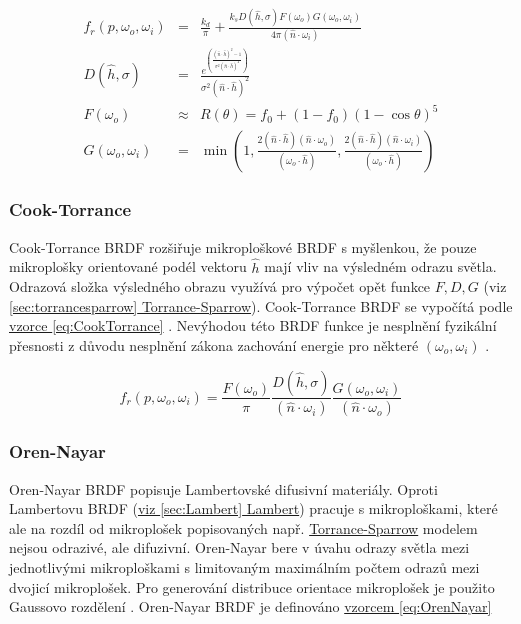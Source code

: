\documentclass[czech,master,dept460,male,cpp,cpdeclaration]{diploma}
\newcommand{\uvec}[1]{\hat{#1}}
\newcommand{\point}{p}
\newcommand{\brdf}{f_r\left(\point,\omega_{o},\omega_{i}\right)}
\newcommand{\normVec}{\uvec{n}}
\newcommand{\inVec}{\omega_{i}}
\newcommand{\outVec}{\omega_{o}}
\newcommand{\halfVec}{\uvec{h}}
\newcommand{\rough}{\sigma}
\newcommand{\ior}{f_0}
\begin{document}
\begin{eqnarray}
    \brdf & = & \frac{k_d}{\pi} + \frac{k_s D(\halfVec,\rough) F(\outVec) G(\outVec,\inVec)}{4\pi (\normVec \cdot \inVec)}\label{eq:TorranceSparrow}\\
    D(\halfVec,\rough) & = & \frac{e^{\left(\frac{(\normVec\cdot \halfVec)^2-1}{\rough^2(\normVec \cdot \halfVec)^2}\right)}}{\rough^2(\normVec\cdot \halfVec)^2}\label{eq:beckDistr}\\
    F(\outVec) & \approx & R(\theta) = \ior + (1-\ior)(1-\cos\theta)^5\label{eq:schlickFresnel}\\
    G(\outVec,\inVec) & = & \min \left( 1, \frac{2 ( \normVec \cdot \halfVec ) ( \normVec \cdot \outVec )
        }{ ( \outVec \cdot \halfVec ) },\frac{ 2 ( \normVec \cdot \halfVec ) ( \normVec \cdot \inVec ) }{ ( \outVec \cdot \halfVec ) } \right) \label{eq:geomAtatenuation}
\end{eqnarray}
\subsubsection{Cook-Torrance}
Cook-Torrance BRDF rozšiřuje mikroploškové BRDF s myšlenkou, že pouze mikroplošky orientované podél vektoru \(\halfVec\) mají vliv na výsledném odrazu světla. Odrazová složka výsledného obrazu využívá pro výpočet opět funkce \(F, D, G\) (viz \hyperref[sec:torrancesparrow]{\ref{sec:torrancesparrow} Torrance-Sparrow}). Cook-Torrance BRDF se vypočítá podle \hyperref[eq:CookTorrance]{vzorce \ref{eq:CookTorrance}} \cite{CookTorranceBRDF}. Nevýhodou této BRDF funkce je nesplnění fyzikální přesnosti z důvodu nesplnění zákona zachování energie pro některé \(\left(\outVec,\inVec\right)\) \cite{BRDFOverview}.

\begin{equation} \label{eq:CookTorrance}
    \brdf  = \frac{F(\outVec)}{\pi} \frac{D(\halfVec,\rough)}{(\normVec\cdot\inVec)} \frac{G(\outVec,\inVec)}{(\normVec\cdot\outVec)}
\end{equation}

\subsubsection{Oren-Nayar}
Oren-Nayar BRDF popisuje Lambertovské difusivní materiály. Oproti Lambertovu BRDF (\hyperref[sec:Lambert]{viz \ref{sec:Lambert} Lambert}) pracuje s mikroploškami, které ale na rozdíl od mikroplošek popisovaných např. \hyperref[sec:torrancesparrow]{Torrance-Sparrow} modelem nejsou odrazivé, ale difuzivní. Oren-Nayar bere v úvahu odrazy světla mezi jednotlivými mikroploškami s limitovaným maximálním počtem odrazů mezi dvojicí mikroplošek. Pro generování distribuce orientace mikroplošek je použito Gaussovo rozdělení \cite{OrenNayar} \cite{BRDFOverview}. Oren-Nayar BRDF je definováno \hyperref[eq:OrenNayar]{vzorcem \ref{eq:OrenNayar}}
\end{document}
